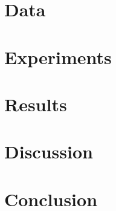 \documentclass[11pt,a4paper]{article}
\begin{document}
\section{Data}


\section{Experiments}


\section{Results}


\section{Discussion}


\section{Conclusion}




\end{document}
